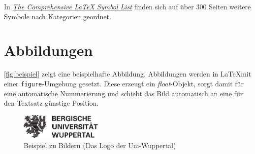 			In \href{http://tug.ctan.org/info/symbols/comprehensive/symbols-a4.pdf}{\emph{The Comprehensive \LaTeX{} Symbol List}} finden sich auf über 300 Seiten weitere Symbole nach Kategorien geordnet.
\clearpage
	\section{Abbildungen}
		\autoref{fig:beispiel} zeigt eine beispielhafte Abbildung.
		Abbildungen werden in \LaTeX mit einer \lstinline[language=thesis-latexbeispiel]|figure|-Umgebung gesetzt.
		Diese erzeugt ein \emph{float}-Objekt, sorgt damit für eine automatische Nummerierung und schiebt das Bild automatisch an eine für den Textsatz günstige Position.%
		\begin{figure}[!h]
			\centering
			\includegraphics[width=4cm]{Medien/Uni_Wuppertal_Logo}
			\caption[Beispiel zu Bildern]{Beispiel zu Bildern (Das Logo der Uni-Wuppertal)}
			\label{fig:beispiel}
		\end{figure}

